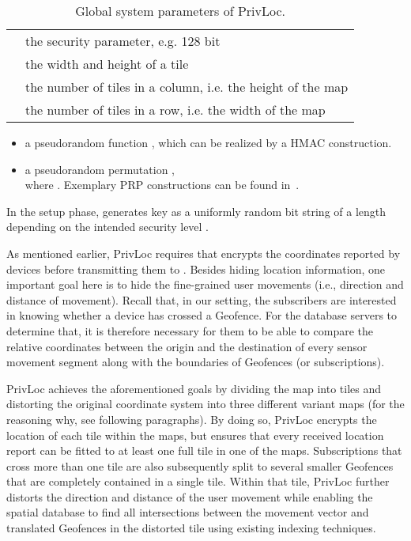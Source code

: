 \documentclass{llncs}
\newcommand\sol{{\sf PrivLoc}}
\begin{document}
\begin{table}[tbp]
\centering
\begin{tabular}{l | p{}}
\hline
 & the security parameter, e.g. 128 bit\\
 & the width and height of a tile\\
& the number of tiles in a column, i.e. the height of the map\\
 & the number of tiles in a row, i.e. the width of the map\\
\hline
\end{tabular}
\caption{Global system parameters of \sol.}
\label{tab:parameters}
\vspace{-1.5 em}
\end{table}


\begin{itemize}
\item a pseudorandom function  , which can be realized by a HMAC construction.
\item a pseudorandom permutation ,\\where . Exemplary PRP constructions can be found in~\cite{black2002ciphers}.
\end{itemize}

In the setup phase,  generates key  as a uniformly random bit string of a length depending on the intended security level . 




As mentioned earlier, \sol{} requires that  encrypts the coordinates reported by devices before transmitting them to . Besides hiding location information, one important goal here is to
hide the fine-grained user movements (i.e., direction and distance of movement).
Recall that, in our setting, the subscribers are interested in knowing whether a device has crossed a Geofence. For the database servers to determine that, it is therefore
necessary for them to be able to compare the relative coordinates between the origin and the destination of every sensor movement segment along with the boundaries of Geofences (or subscriptions).


\sol{} achieves the aforementioned goals by dividing the map into tiles and distorting the original coordinate system into three different variant maps (for the reasoning why, see following paragraphs).
By doing so, \sol{} encrypts the location of each tile within the maps, but ensures that every received location report can be fitted to at least one full tile in one of the maps. Subscriptions that cross more than one tile
are also subsequently split to several smaller Geofences that are completely contained in a single tile. Within that tile, \sol{} further distorts
the direction and distance of the user movement while enabling the spatial database to find all intersections between the movement vector and translated Geofences in the distorted tile using existing indexing techniques.
\end{document}
